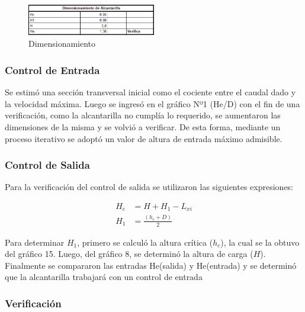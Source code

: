 \documentclass[../main.tex]{subfiles}
\begin{document}
\begin{figure}[h]
    \centering
    \includegraphics[width=0.5\textwidth]{images/google_sheets/Screenshot_19.png}
    \caption{Dimensionamiento}
    \label{fig:Dimensionamiento2}
\end{figure}

\subsubsection{Control de Entrada}
 Se estimó una sección transversal inicial como el cociente entre el caudal dado y la velocidad máxima. Luego se ingresó en el gráfico Nº1 (He/D) con el fin de una verificación, como la alcantarilla no cumplía lo requerido, se aumentaron las dimensiones de la misma y se volvió a verificar. De esta forma, mediante un proceso iterativo se adoptó un valor de altura de entrada máximo admisible.
 
\subsubsection{Control de Salida}

Para la verificación del control de salida se utilizaron las siguientes expresiones:

\begin{align}
H_e &= H + H_1 - L_{xi} \\
H_1 &= \frac{(h_c + D)}{2}
\end{align}

Para determinar $H_1$, primero se calculó la altura crítica ($h_c$), la cual se la obtuvo del gráfico 15. Luego, del gráfico 8, se determinó la altura de carga ($H$). 
Finalmente se compararon las entradas He(salida) y He(entrada) y se determinó que la alcantarilla trabajará con un control de entrada 

\subsubsection{Verificación}
\end{document}
